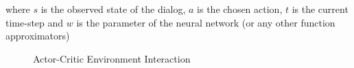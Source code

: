\documentclass[12pt]{extarticle}
\numberwithin{equation}{section}
\begin{document}
	where $s$ is the observed state of the dialog, $a$ is the chosen action, $t$ is the current time-step and $w$ is the parameter of the neural network (or any other function approximators) 
	\begin{figure}[h]
		\centering
		\setlength{\fboxsep}{5pt}%
		\setlength{\fboxrule}{1pt}%
		\caption{Actor-Critic Environment Interaction
			\label{a2c}}
	\end{figure}
\end{document}
